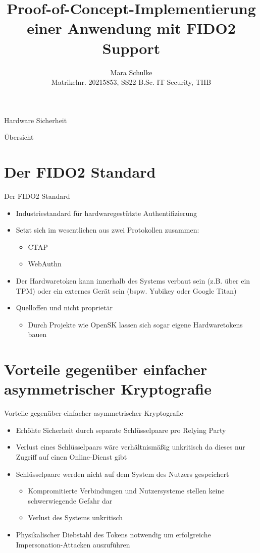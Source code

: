 \documentclass{beamer}
\title{Proof-of-Concept-Implementierung einer Anwendung mit FIDO2 Support}
\author{Mara Schulke\\\tiny{Matrikelnr. 20215853, SS22 B.Sc. IT Security, THB}}
\begin{document}
\begin{frame}
	Hardware Sicherheit
	\vspace{1em}
	\titlepage
\end{frame}

\begin{frame}{Übersicht}
	\tableofcontents
\end{frame}

\section{Der FIDO2 Standard}
\begin{frame}{Der FIDO2 Standard}
	\begin{itemize}
		\item Industriestandard für hardwaregestützte Authentifizierung
		\item Setzt sich im wesentlichen aus zwei
			Protokollen zusammen:
			\begin{itemize}
				\item CTAP
				\item WebAuthn
			\end{itemize}
		\item Der Hardwaretoken kann innerhalb des Systems verbaut sein (z.B.
			über ein TPM) oder ein externes Gerät sein (bspw. Yubikey oder
			Google Titan)
		\item Quelloffen und nicht proprietär
			\begin{itemize}
				\item Durch Projekte wie OpenSK lassen sich sogar eigene
					Hardwaretokens bauen
			\end{itemize}
	\end{itemize}
\end{frame}

\section{Vorteile gegenüber einfacher asymmetrischer Kryptografie}
\begin{frame}{Vorteile gegenüber einfacher asymmetrischer Kryptografie}
	\begin{itemize}
		\item Erhöhte Sicherheit durch separate Schlüsselpaare pro Relying Party
		\item Verlust eines Schlüsselpaars wäre verhältnismäßig unkritisch da
			dieses nur Zugriff auf einen Online-Dienst gibt
		\item Schlüsselpaare werden nicht auf dem System des Nutzers gespeichert
			\begin{itemize}
				\item Kompromitierte Verbindungen und Nutzersysteme stellen keine schwerwiegende Gefahr dar
				\item Verlust des Systems unkritisch
			\end{itemize}
		\item Physikalischer Diebstahl des Tokens notwendig um erfolgreiche
			Impersonation-Attacken auszuführen
	\end{itemize}
\end{frame}
\end{document}
